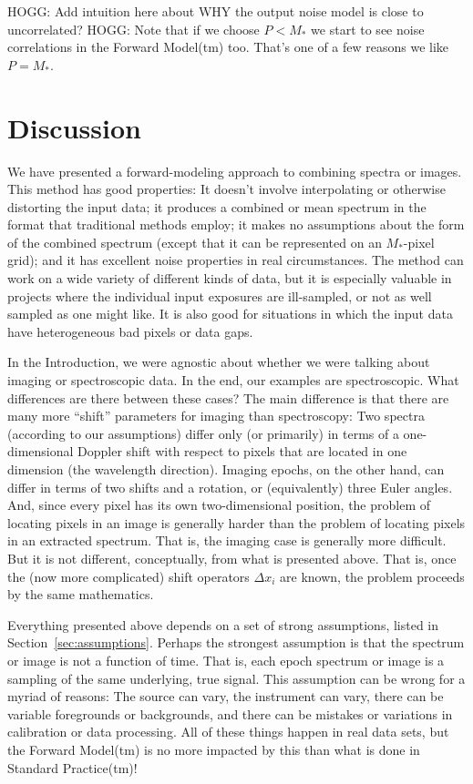 \documentclass[modern]{aastex631}
\newcommand{\sectionname}{Section}
\begin{document}
HOGG: Add intuition here about WHY the output noise model is close to uncorrelated?
HOGG: Note that if we choose $P<M_\ast$ we start to see noise correlations in the Forward Model(tm) too.
That's one of a few reasons we like $P=M_\ast$.

\section{Discussion}\label{sec:discussion}

We have presented a forward-modeling approach to combining spectra or images.
This method has good properties:
It doesn't involve interpolating or otherwise distorting the input data;
it produces a combined or mean spectrum in the format that traditional methods employ;
it makes no assumptions about the form of the combined spectrum (except that it can be represented on an $M_\ast$-pixel grid);
and it has excellent noise properties in real circumstances.
The method can work on a wide variety of different kinds of data, but it is especially valuable in projects where the individual input exposures are ill-sampled, or not as well sampled as one might like.
It is also good for situations in which the input data have heterogeneous bad pixels or data gaps.

In the Introduction, we were agnostic about whether we were talking about imaging or spectroscopic data.
In the end, our examples are spectroscopic.
What differences are there between these cases?
The main difference is that there are many more ``shift'' parameters for imaging than spectroscopy:
Two spectra (according to our assumptions) differ only (or primarily) in terms of a one-dimensional Doppler shift with respect to pixels that are located in one dimension (the wavelength direction).
Imaging epochs, on the other hand, can differ in terms of two shifts and a rotation, or (equivalently) three Euler angles.
And, since every pixel has its own two-dimensional position, the problem of locating pixels in an image is generally harder than the problem of locating pixels in an extracted spectrum.
That is, the imaging case is generally more difficult.
But it is not different, conceptually, from what is presented above.
That is, once the (now more complicated) shift operators $\Delta x_i$ are known, the problem proceeds by the same mathematics.

Everything presented above depends on a set of strong assumptions, listed in \sectionname~\ref{sec:assumptions}.
Perhaps the strongest assumption is that the spectrum or image is not a function of time.
That is, each epoch spectrum or image is a sampling of the same underlying, true signal.
This assumption can be wrong for a myriad of reasons:
The source can vary, the instrument can vary, there can be variable foregrounds or backgrounds, and there can be mistakes or variations in calibration or data processing.
All of these things happen in real data sets, but the Forward Model(tm) is no more impacted by this than what is done in Standard Practice(tm)!
\end{document}
